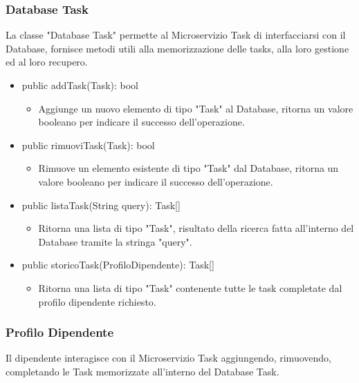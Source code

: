 \documentclass{report}
\begin{document}
\subsubsection*{Database Task}
La classe "Database Task" permette al Microservizio Task di interfacciarsi con il Database, fornisce metodi utili alla memorizzazione delle tasks, alla loro gestione ed al loro recupero. 
\begin{itemize}
\item public addTask(Task): bool
\begin{itemize}
    \item Aggiunge un nuovo elemento di tipo "Task" al Database, ritorna un valore booleano per indicare il successo dell'operazione.
\end{itemize}
\item public rimuoviTask(Task): bool
\begin{itemize}
    \item Rimuove un elemento esistente di tipo "Task" dal Database, ritorna un valore booleano per indicare il successo dell'operazione.
\end{itemize}
\item public listaTask(String query): Task[]
\begin{itemize}
    \item Ritorna una lista di tipo "Task", risultato della ricerca fatta all'interno del Database tramite la stringa "query".
\end{itemize}
\item public storicoTask(ProfiloDipendente): Task[]
\begin{itemize}
    \item Ritorna una lista di tipo "Task" contenente tutte le task completate dal profilo dipendente richiesto.
\end{itemize}
\end{itemize}

\subsubsection*{Profilo Dipendente}
Il dipendente interagisce con il Microservizio Task aggiungendo, rimuovendo, completando le Task memorizzate all'interno del Database Task.
\end{document}
